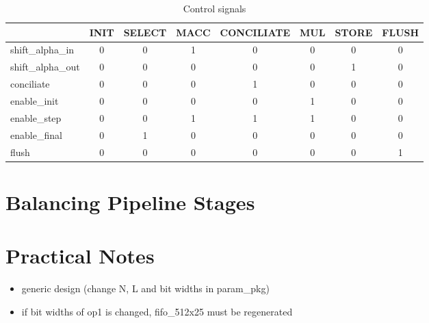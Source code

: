 \documentclass[mscthesis]{usiinfthesis}
\begin{document}
\begin{table}
    \begin{center}
    \begin{tabular}{|l|c|c|c|c|c|c|c|}
    \hline
                      & INIT & SELECT & MACC & CONCILIATE & MUL & STORE & FLUSH \\
    \hline
    shift\_alpha\_in  & 0    & 0      & 1    & 0          & 0   & 0     & 0     \\
    shift\_alpha\_out & 0    & 0      & 0    & 0          & 0   & 1     & 0     \\
    conciliate        & 0    & 0      & 0    & 1          & 0   & 0     & 0     \\
    enable\_init      & 0    & 0      & 0    & 0          & 1   & 0     & 0     \\
    enable\_step      & 0    & 0      & 1    & 1          & 1   & 0     & 0     \\
    enable\_final     & 0    & 1      & 0    & 0          & 0   & 0     & 0     \\
    flush             & 0    & 0      & 0    & 0          & 0   & 0     & 1     \\
    \hline
    \end{tabular}
    \end{center}
    \caption{Control signals}
    \label{tab:ctrl}
\end{table}

\section{Balancing Pipeline Stages}

\section{Practical Notes}

\begin{itemize}
    \item generic design (change N, L and bit widths in param\_pkg)
    \item if bit widths of op1 is changed, fifo\_512x25 must be regenerated
\end{itemize}
\end{document}
